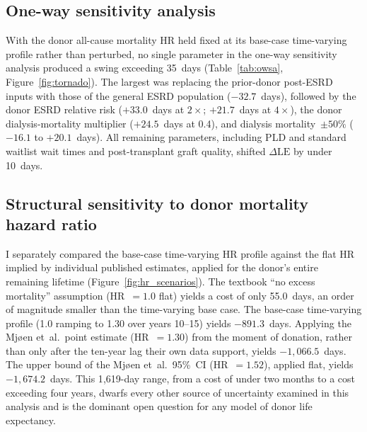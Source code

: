 \subsection{One-way sensitivity analysis}
\label{sec:owsa}
With the donor all-cause mortality HR held fixed at its base-case time-varying profile rather than perturbed, no single parameter in the one-way sensitivity analysis produced a swing exceeding 35~days (Table~\ref{tab:owsa}, Figure~\ref{fig:tornado}). The largest was replacing the prior-donor post-ESRD inputs with those of the general ESRD population ($-32.7$~days), followed by the donor ESRD relative risk ($+33.0$~days at $2\times$; $+21.7$~days at $4\times$), the donor dialysis-mortality multiplier ($+24.5$~days at 0.4), and dialysis mortality~$\pm 50\%$ ($-16.1$ to $+20.1$~days). All remaining parameters, including PLD and standard waitlist wait times and post-transplant graft quality, shifted $\Delta\text{LE}$ by under 10~days.


\subsection{Structural sensitivity to donor mortality hazard ratio}
\label{sec:results-hr-structural}
I separately compared the base-case time-varying HR profile against the flat HR implied by individual published estimates, applied for the donor's entire remaining lifetime (Figure~\ref{fig:hr_scenarios}).
The textbook ``no excess mortality'' assumption (HR~$=1.0$ flat) yields a cost of only 55.0~days, an order of magnitude smaller than the time-varying base case. The base-case time-varying profile (1.0 ramping to 1.30 over years 10--15) yields $-891.3$~days. Applying the Mjøen et~al.\ point estimate (HR~$=1.30$) from the moment of donation, rather than only after the ten-year lag their own data support, yields $-1{,}066.5$~days. The upper bound of the Mjøen et~al.\ 95\%~CI (HR~$=1.52$), applied flat, yields $-1{,}674.2$~days. This 1{,}619-day range, from a cost of under two months to a cost exceeding four years, dwarfs every other source of uncertainty examined in this analysis and is the dominant open question for any model of donor life expectancy.

